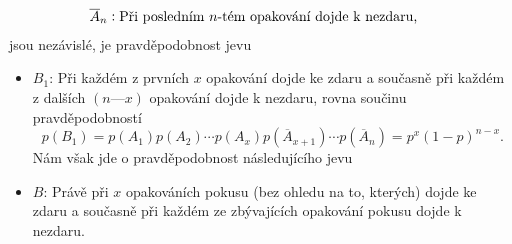 \begin{example}
\begin{align*}
    \overline{A}_n     &: \text{Při posledním \(n\)-tém opakování dojde k nezdaru,}
  \normalsize
  \end{align*}
  jsou nezávislé, je pravděpodobnost jevu
  \begin{itemize}
    \item \(B_1\): Při každém z prvních \(x\) opakování dojde ke zdaru a současně při každém z 
          dalších \((n — x)\) opakování dojde k nezdaru, rovna součinu pravděpodobností
          \begin{equation*}
            p(B_1) = p(A_1)p(A_2)\cdots p(A_x)p(\overline{A}_{x+1})\cdots p(\overline{A}_n) 
                   = p^x (1 - p)^{n-x}.
          \end{equation*}
          Nám však jde o pravděpodobnost následujícího jevu
    \item \(B\): Právě při \(x\) opakováních pokusu (bez ohledu na to, kterých) dojde ke zdaru a 
          současně při každém ze zbývajících opakování pokusu dojde k nezdaru.
  \end{itemize}
\end{example}